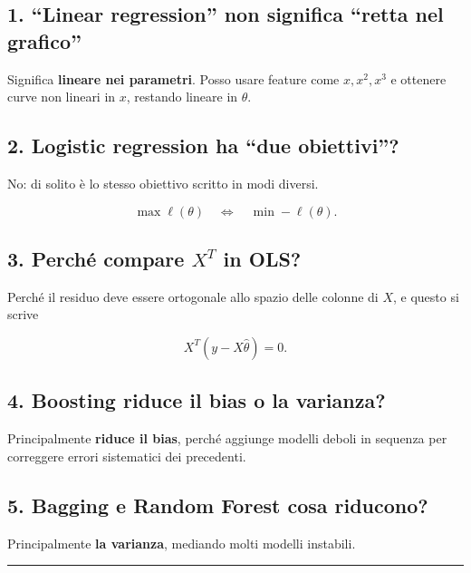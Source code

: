 \documentclass{article}
\begin{document}
\subsection{1. ``Linear regression'' non significa ``retta nel
grafico''}\label{linear-regression-non-significa-retta-nel-grafico}

Significa \textbf{lineare nei parametri}. Posso usare feature come
\(x, x^2, x^3\) e ottenere curve non lineari in \(x\), restando lineare
in \(\theta\).

\subsection{2. Logistic regression ha ``due
obiettivi''?}\label{logistic-regression-ha-due-obiettivi}

No: di solito è lo stesso obiettivo scritto in modi diversi.

\[
\max \ell(\theta)
\quad\Longleftrightarrow\quad
\min -\ell(\theta).
\]

\subsection{\texorpdfstring{3. Perché compare \(X^T\) in
OLS?}{3. Perché compare X\^{}T in OLS?}}\label{perchuxe9-compare-xt-in-ols}

Perché il residuo deve essere ortogonale allo spazio delle colonne di
\(X\), e questo si scrive

\[
X^T(y-X\hat\theta)=0.
\]

\subsection{4. Boosting riduce il bias o la
varianza?}\label{boosting-riduce-il-bias-o-la-varianza}

Principalmente \textbf{riduce il bias}, perché aggiunge modelli deboli
in sequenza per correggere errori sistematici dei precedenti.

\subsection{5. Bagging e Random Forest cosa
riducono?}\label{bagging-e-random-forest-cosa-riducono}

Principalmente \textbf{la varianza}, mediando molti modelli instabili.

\begin{center}\rule{0.5\linewidth}{0.5pt}\end{center}

\end{document}
